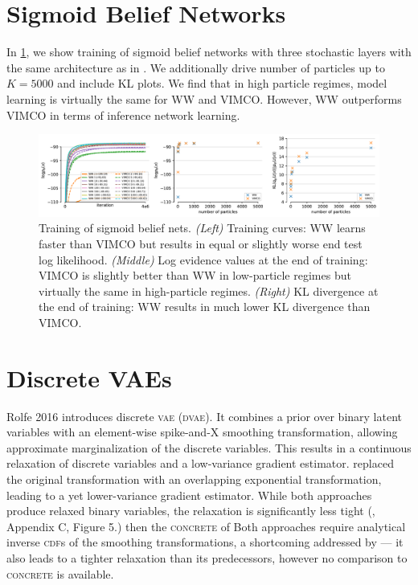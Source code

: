 \section{Sigmoid Belief Networks}
\label{app:sigmoid_belief_nets}

In \cref{fig:sbn}, we show training of sigmoid belief networks with three stochastic layers with the same architecture as in \citet{Mnih2016variational}.
We additionally drive number of particles up to $K = 5000$ and include \gls{KL} plots.
We find that in high particle regimes, model learning is virtually the same for \gls{WW} and \gls{VIMCO}.
However, \gls{WW} outperforms \gls{VIMCO} in terms of inference network learning.

\begin{figure}[!ht]
  \includegraphics[width=\textwidth]{figures/RRWS/discrete_vae/rws_baselines.pdf}
  \vspace*{-4ex}
  \caption{
    Training of sigmoid belief nets.
    \emph{(Left)}
    Training curves:
    \gls{WW} learns faster than \gls{VIMCO} but results in equal or slightly worse end test log likelihood.
    \emph{(Middle)}
    Log evidence values at the end of training:
    \gls{VIMCO} is slightly better than \gls{WW} in low-particle regimes but virtually the same in high-particle regimes.
    \emph{(Right)}
    \gls{KL} divergence at the end of training:
    \gls{WW} results in much lower \gls{KL} divergence than \gls{VIMCO}.
  }
  \label{fig:sbn}
  \vspace*{-2ex}
\end{figure}

\section{Discrete VAEs}
\label{app:dvae}

Rolfe 2016 \citep{Rolfe2016dvae} introduces discrete \textsc{vae} (\textsc{dvae}).
It combines a prior over binary latent variables with an element-wise spike-and-X smoothing transformation, allowing approximate marginalization of the discrete variables.
This results in a continuous relaxation of discrete variables and a low-variance gradient estimator.
\citet{Vahdat2018dvaepp} replaced the original transformation with an overlapping exponential transformation, leading to a yet lower-variance gradient estimator.
While both approaches produce relaxed binary variables, the relaxation is  significantly less tight (\cite{Vahdat2018dvaepp}, Appendix C, Figure 5.) then the \textsc{concrete} of \cite{Jang2017categorical,Maddison2017concrete}
Both approaches require analytical inverse \textsc{cdf}s of the smoothing transformations, a shortcoming addressed by \citet{Vahdat2018dvaehash} --- it also leads to a tighter relaxation than its predecessors, however no comparison to \textsc{concrete} is available.

